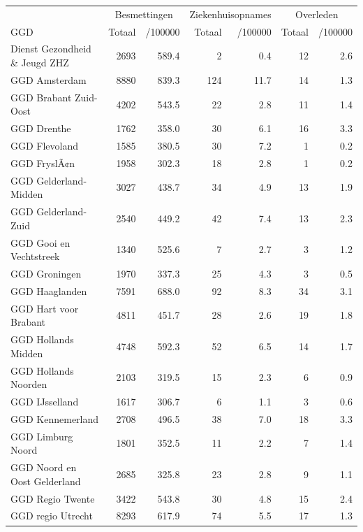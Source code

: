 \documentclass[
  english,
  man,floatsintext]{apa6}
\begin{document}
\begin{table}[H]
\centering\begingroup\fontsize{10}{12}\selectfont

\begin{threeparttable}
\begin{tabular}{lrrrrrr}
\toprule
\multicolumn{1}{c}{ } & \multicolumn{2}{c}{Besmettingen} & \multicolumn{2}{c}{Ziekenhuisopnames} & \multicolumn{2}{c}{Overleden} \\
\cmidrule(l{3pt}r{3pt}){2-3} \cmidrule(l{3pt}r{3pt}){4-5} \cmidrule(l{3pt}r{3pt}){6-7}
GGD & Totaal & /100000 & Totaal & /100000 & Totaal & /100000\\
\midrule
Dienst Gezondheid \& Jeugd ZHZ & 2693 & 589.4 & 2 & 0.4 & 12 & 2.6\\
GGD Amsterdam & 8880 & 839.3 & 124 & 11.7 & 14 & 1.3\\
GGD Brabant Zuid-Oost & 4202 & 543.5 & 22 & 2.8 & 11 & 1.4\\
GGD Drenthe & 1762 & 358.0 & 30 & 6.1 & 16 & 3.3\\
GGD Flevoland & 1585 & 380.5 & 30 & 7.2 & 1 & 0.2\\
GGD FryslÃ¢n & 1958 & 302.3 & 18 & 2.8 & 1 & 0.2\\
GGD Gelderland-Midden & 3027 & 438.7 & 34 & 4.9 & 13 & 1.9\\
GGD Gelderland-Zuid & 2540 & 449.2 & 42 & 7.4 & 13 & 2.3\\
GGD Gooi en Vechtstreek & 1340 & 525.6 & 7 & 2.7 & 3 & 1.2\\
GGD Groningen & 1970 & 337.3 & 25 & 4.3 & 3 & 0.5\\
GGD Haaglanden & 7591 & 688.0 & 92 & 8.3 & 34 & 3.1\\
GGD Hart voor Brabant & 4811 & 451.7 & 28 & 2.6 & 19 & 1.8\\
GGD Hollands Midden & 4748 & 592.3 & 52 & 6.5 & 14 & 1.7\\
GGD Hollands Noorden & 2103 & 319.5 & 15 & 2.3 & 6 & 0.9\\
GGD IJsselland & 1617 & 306.7 & 6 & 1.1 & 3 & 0.6\\
GGD Kennemerland & 2708 & 496.5 & 38 & 7.0 & 18 & 3.3\\
GGD Limburg Noord & 1801 & 352.5 & 11 & 2.2 & 7 & 1.4\\
GGD Noord en Oost Gelderland & 2685 & 325.8 & 23 & 2.8 & 9 & 1.1\\
GGD Regio Twente & 3422 & 543.8 & 30 & 4.8 & 15 & 2.4\\
GGD regio Utrecht & 8293 & 617.9 & 74 & 5.5 & 17 & 1.3\\

\end{tabular}
\end{threeparttable}
\end{table}
\end{document}
